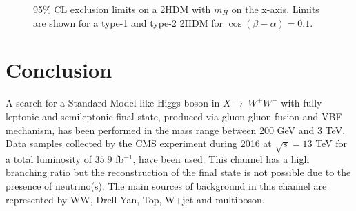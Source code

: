 \begin{figure}[htb]
\centering
{}

\caption{95$\%$ CL exclusion limits on a 2HDM with $m_{H}$ on the x-axis. Limits are shown for a type-1 and type-2 2HDM for $\cos(\beta-\alpha)=0.1$.}
    \label{fig:2HDM2}
\end{figure}



\chapter*{Conclusion}
A search for a Standard Model-like Higgs boson in $X \to \ W^+W^-$ with fully leptonic and semileptonic final state, produced via gluon-gluon fusion and VBF 
mechanism, has been performed in the mass range between 200 GeV and 3 TeV.
Data samples collected by the CMS experiment during 2016 at $\sqrt{s}=13$ TeV for a total luminosity of $35.9$ fb$^{-1}$, have been used.
This channel has a high branching ratio but the reconstruction of the final state is not possible due to the presence of neutrino(s). 
The main sources of background in this channel are represented by WW, Drell-Yan, Top, W+jet and multiboson.

